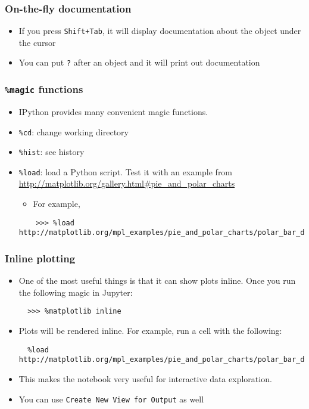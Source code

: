 \documentclass[10pt,article]{article}
\begin{document}
\subsubsection{On-the-fly documentation}
\label{sec:orgf42edb4}
\begin{itemize}
\item If you press \texttt{Shift+Tab}, it will display documentation about the object
under the cursor
\item You can put \texttt{?} after an object and it will print out documentation
\end{itemize}
\subsubsection{\texttt{\%magic} functions}
\label{sec:org316c866}
\begin{itemize}
\item IPython provides many convenient magic functions.
\item \texttt{\%cd}: change working directory
\item \texttt{\%hist}: see history
\item \texttt{\%load}: load a Python script. Test it with an example from    
\url{http://matplotlib.org/gallery.html\#pie\_and\_polar\_charts}

\begin{itemize}
\item For example,
\end{itemize}
\begin{verbatim}
    >>> %load http://matplotlib.org/mpl_examples/pie_and_polar_charts/polar_bar_demo.py
\end{verbatim}
\end{itemize}
\subsubsection{Inline plotting}
\label{sec:org05306c3}
\begin{itemize}
\item One of the most useful things is that it can show plots inline. Once you run
the following magic in Jupyter:

\begin{verbatim}
  >>> %matplotlib inline
\end{verbatim}

\item Plots will be rendered inline. For example, run a cell with the following:

\begin{verbatim}
  %load http://matplotlib.org/mpl_examples/pie_and_polar_charts/polar_bar_demo.py
\end{verbatim}

\item This makes the notebook very useful for interactive data exploration.
\item You can use \texttt{Create New View for Output} as well
\end{itemize}
\end{document}
